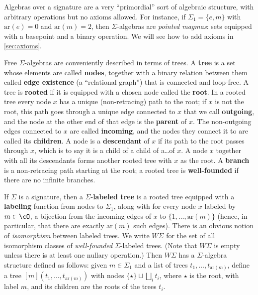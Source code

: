 \documentclass{book}
\def\ay{\mathrm{ar}}
\def\sig{\Sigma}
\def\act#1{[#1]}
\begin{document}
Algebras over a signature are a very ``primordial'' sort of algebraic structure, with arbitrary operations but no axioms allowed.
For instance, if $\sig_1=\{e,m\}$ with $\ay(e)=0$ and $\ay(m)=2$, then $\sig$-algebras are \emph{pointed magmas}: sets equipped with a basepoint and a binary operation.
We will see how to add axioms in \cref{sec:axioms}.

Free $\sig$-algebras are conveniently described in terms of {trees}.
A \textbf{tree} is a set whose elements are called \textbf{nodes}, together with a binary relation between them called \textbf{edge existence} (a ``relational graph'') that is connected and loop-free.
A tree is \textbf{rooted} if it is equipped with a chosen node called the \textbf{root}.
In a rooted tree every node $x$ has a unique (non-retracing) path to the root; if $x$ is not the root, this path goes through a unique edge connected to $x$ that we call \textbf{outgoing}, and the node at the other end of that edge is the \textbf{parent} of $x$.
The non-outgoing edges connected to $x$ are called \textbf{incoming}, and the nodes they connect it to are called its \textbf{children}.
A node is a \textbf{descendant} of $x$ if its path to the root passes through $x$, which is to say it is a child of a child of a\dots of $x$.
A node $x$ together with all its descendants forms another rooted tree with $x$ as the root.
A \textbf{branch} is a non-retracing path starting at the root; a rooted tree is \textbf{well-founded} if there are no infinite branches.

If $\sig$ is a signature, then a $\sig$-\textbf{labeled tree} is a rooted tree equipped with a \textbf{labeling} function from nodes to $\sig_1$, along with for every node $x$ labeled by $m\in\cO$, a bijection from the incoming edges of $x$ to $\{1,\dots,\ay(m)\}$ (hence, in particular, that there are exactly $\ay(m)$ such edges).
There is an obvious notion of \emph{isomorphism} between labeled trees.
We write $W\sig$ for the set of all isomorphism classes of \emph{well-founded} $\sig$-labeled trees.
(Note that $W\sig$ is empty unless there is at least one nullary operation.)
Then $W\sig$ has a $\sig$-algebra structure defined as follows: given $m\in\sig_1$ and a list of trees $t_1,\dots,t_{\ay(m)}$, define a tree $\act m (t_1,\dots,t_{\ay(m)})$ with nodes $\{\star\} \sqcup \bigsqcup_i t_i$, where $\star$ is the root, with label $m$, and its children are the roots of the trees $t_i$.
\end{document}
